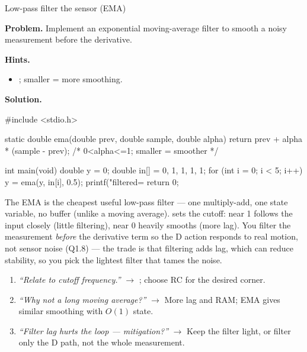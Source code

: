 \begin{gymproblem}{Low-pass filter the sensor (EMA)}

\textbf{Problem.} Implement an exponential moving-average filter to smooth a
noisy measurement before the derivative.

\textbf{Hints.}
\begin{itemize}
\item {}; smaller  = more smoothing.
\end{itemize}

\attempt

\textbf{Solution.}
\begin{cgym}
#include <stdio.h>

static double ema(double prev, double sample, double alpha) {
    return prev + alpha * (sample - prev);   /* 0<alpha<=1; smaller = smoother */
}

int main(void) {
    double y = 0;
    double in[] = {0, 1, 1, 1, 1};
    for (int i = 0; i < 5; i++) y = ema(y, in[i], 0.5);
    printf("filtered=%
    return 0;
}
\end{cgym}

The EMA is the cheapest useful low-pass filter --- one multiply-add, one state
variable, no buffer (unlike a moving average).  sets the cutoff: near
1 follows the input closely (little filtering), near 0 heavily smooths (more lag).
You filter the measurement \emph{before} the derivative term so the D action
responds to real motion, not sensor noise (Q1.8) --- the trade is that filtering
adds lag, which can reduce stability, so you pick the lightest filter that tames
the noise.

\followups
\begin{enumerate}
\item \emph{``Relate  to cutoff frequency.''} $\rightarrow$
  ; choose RC for the desired corner.
\item \emph{``Why not a long moving average?''} $\rightarrow$ More lag and RAM;
  EMA gives similar smoothing with $O(1)$ state.
\item \emph{``Filter lag hurts the loop --- mitigation?''} $\rightarrow$ Keep
  the filter light, or filter only the D path, not the whole measurement.
\end{enumerate}
\end{gymproblem}

